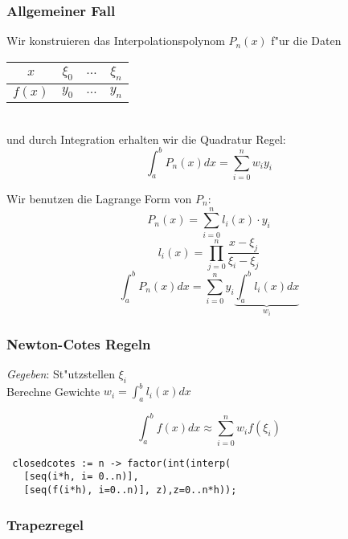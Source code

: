 \documentclass[german, 10pt, a4paper, twocolumn]{scrartcl}
\theoremstyle{definition}
\begin{document}
\subsubsection{Allgemeiner Fall}

Wir konstruieren das Interpolationspolynom $P_n(x)$ f"ur die Daten\\

\begin{tabular}{c|ccc}
	$x$ &		$\xi_0$ &	$\ldots$ &	$\xi_n$ \\ \hline
	$f(x)$ &	$y_0$ &		$\ldots$ &	$y_n$
\end{tabular}\\

und durch Integration erhalten wir die Quadratur Regel:
\begin{displaymath}
	\int^b_a P_n(x) dx = \sum^n_{i=0} w_i y_i
\end{displaymath}

Wir benutzen die Lagrange Form von $P_n$:
\begin{displaymath}
	P_n(x) = \sum^n_{i=0} l_i(x)\cdotp y_i
\end{displaymath}
\begin{displaymath}
	l_i(x) = \prod^n_{j=0} \frac{x-\xi_j}{\xi_i - \xi_j}
\end{displaymath}
\begin{displaymath}
	\int^b_a P_n(x) dx = \sum^n_{i=0} y_i \underbrace{\int^b_a l_i(x) dx}_{w_i}
\end{displaymath}

\subsubsection{Newton-Cotes Regeln}

\textit{Gegeben}: St"utzstellen $\xi_i$\\
Berechne Gewichte $w_i = \int^b_a l_i(x) dx$

\begin{displaymath}
	\int^b_a f(x)dx \approx \sum^n_{i=0} w_i f(\xi_i)
\end{displaymath}

\small
\begin{verbatim}
 closedcotes := n -> factor(int(interp(
   [seq(i*h, i= 0..n)],
   [seq(f(i*h), i=0..n)], z),z=0..n*h));
\end{verbatim}
\normalsize

\subsubsection{Trapezregel}
\end{document}
